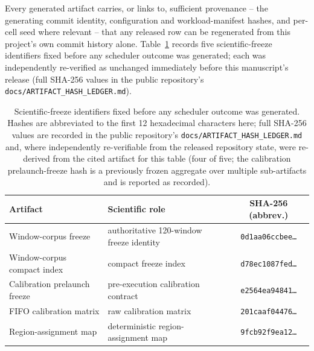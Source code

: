 Every generated artifact carries, or links to, sufficient provenance --
the generating commit identity, configuration and workload-manifest
hashes, and per-cell seed where relevant -- that any released row can be
regenerated from this project's own commit history alone. Table~\ref{tab:hashes}
records five scientific-freeze identifiers fixed before any scheduler
outcome was generated; each was independently re-verified as unchanged
immediately before this manuscript's release (full SHA-256 values in the
public repository's \texttt{docs/ARTIFACT\_HASH\_LEDGER.md}).

\begin{table}[t]
\centering
\caption{Scientific-freeze identifiers fixed before any scheduler outcome
was generated. Hashes are abbreviated to the first 12 hexadecimal
characters here; full SHA-256 values are recorded in the public
repository's \texttt{docs/ARTIFACT\_HASH\_LEDGER.md} and, where independently re-verifiable
from the released repository state, were re-derived from the cited
artifact for this table (four of five; the calibration prelaunch-freeze
hash is a previously frozen aggregate over multiple sub-artifacts and is
reported as recorded).}
\label{tab:hashes}
\begin{tabular}{llc}
\toprule
Artifact & Scientific role & SHA-256 (abbrev.) \\
\midrule
Window-corpus freeze & authoritative 120-window freeze identity & \texttt{0d1aa06ccbee\ldots} \\
Window-corpus compact index & compact freeze index & \texttt{d78ec1087fed\ldots} \\
Calibration prelaunch freeze & pre-execution calibration contract & \texttt{e2564ea94841\ldots} \\
FIFO calibration matrix & raw calibration matrix & \texttt{201caaf04476\ldots} \\
Region-assignment map & deterministic region-assignment map & \texttt{9fcb92f9ea12\ldots} \\
\bottomrule
\end{tabular}
\end{table}

